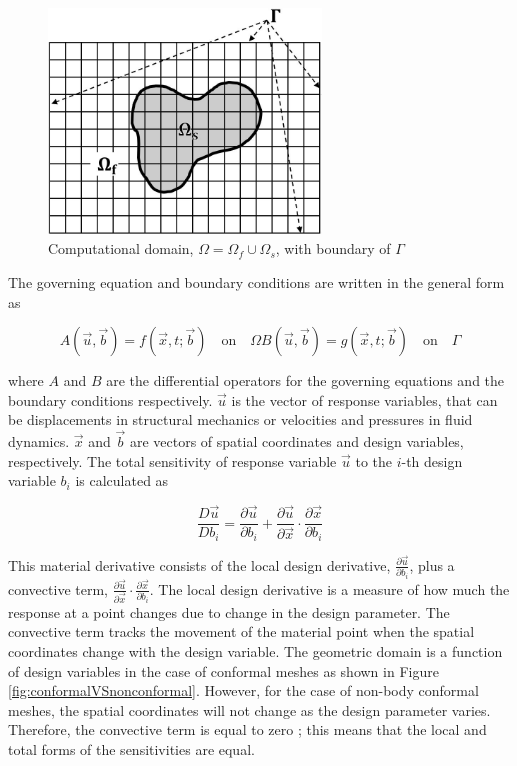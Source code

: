 \documentclass[12pt]{aiaa-pretty}
\begin{document}
%
\begin{figure}[H]
	\centering
	\includegraphics[height=6.0cm]{figure/domain.jpg}
	\caption{Computational domain, $\Omega = \Omega_f \cup \Omega_s$, with boundary of $\Gamma$}
	\label{fig:domain}
\end{figure}
%

The governing equation and boundary conditions are written in the general form as

%
\begin{subequations}\label{eq:generalFormForGE}
\begin{equation}
	A(\vec{u}, \vec{b}) = f(\vec{x}, t; \vec{b}) \quad \text{on} \quad \Omega
\end{equation}
\begin{equation}
	B(\vec{u}, \vec{b}) = g(\vec{x}, t; \vec{b}) \quad \text{on} \quad \Gamma
\end{equation}
\end{subequations}
%

where $A$ and $B$ are the differential operators for the governing equations and the boundary conditions respectively. $\vec{u}$ is the vector of response variables, that can be displacements in structural mechanics or velocities and pressures in fluid dynamics. $\vec{x}$ and $\vec{b}$ are vectors of spatial coordinates and design variables, respectively. The total sensitivity of response variable $\vec{u}$ to the $i$-th design variable $b_i$ is calculated as

%
\begin{equation}
	\frac{D\vec{u}}{Db_i	} = \frac{\partial \vec{u}}{\partial b_i} + 
	                        \frac{\partial \vec{u}}{\partial \vec{x}} \cdot \frac{\partial \vec{x}}{\partial b_i}
\end{equation}
%

This material derivative consists of the local design derivative, $\frac{\partial \vec{u}}{\partial b_i}$, plus a convective term, $\frac{\partial \vec{u}}{\partial \vec{x}} \cdot \frac{\partial \vec{x}}{\partial b_i}$. The local design derivative is a measure of how much the response at a point changes due to change in the design parameter. The convective term tracks the movement of the material point when the spatial coordinates change with the design variable. The geometric domain is a function of design variables in the case of conformal meshes as shown in Figure \ref{fig:conformalVSnonconformal}. However, for the case of non-body conformal meshes, the spatial coordinates will not change as the design parameter varies. Therefore, the convective term is equal to zero \cite{gobal2014continuum}; this means that the local and total forms of the sensitivities are equal.
\end{document}
